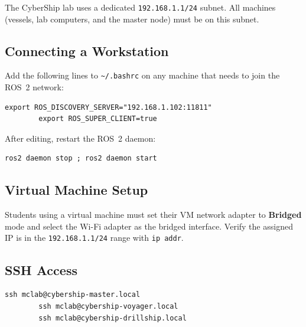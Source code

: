 \documentclass[12pt,a4paper]{article}
\begin{document}
	\noindent{}
	
	\bigskip
	
	The CyberShip lab uses a dedicated \texttt{192.168.1.1/24} subnet. All machines (vessels, lab
	computers, and the master node) must be on this subnet.
	
	\subsection{Connecting a Workstation}
	
	Add the following lines to \texttt{\textasciitilde/.bashrc} on any machine that needs to join the
	ROS~2 network:
	
	\begin{lstlisting}[style=bash]
		export ROS_DISCOVERY_SERVER="192.168.1.102:11811"
		export ROS_SUPER_CLIENT=true
	\end{lstlisting}
	
	After editing, restart the ROS~2 daemon:
	
	\begin{lstlisting}[style=bash]
		ros2 daemon stop ; ros2 daemon start
	\end{lstlisting}
	
	\subsection{Virtual Machine Setup}
	
	Students using a virtual machine must set their VM network adapter to \textbf{Bridged} mode and
	select the Wi-Fi adapter as the bridged interface. Verify the assigned IP is in the
	\texttt{192.168.1.1/24} range with \texttt{ip addr}.
	
	\subsection{SSH Access}
	
	\begin{lstlisting}[style=bash]
		ssh mclab@cybership-master.local
		ssh mclab@cybership-voyager.local
		ssh mclab@cybership-drillship.local
	\end{lstlisting}
	
\end{document}
